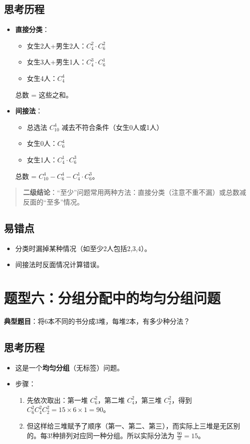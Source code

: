 \documentclass[10pt]{article}
\begin{document}
\subsection*{思考历程}
\begin{itemize}
\item \textbf{直接分类}：
\begin{itemize}
\item 女生2人+男生2人：\(C_4^2 \cdot C_6^2\)
\item 女生3人+男生1人：\(C_4^3 \cdot C_6^1\)
\item 女生4人：\(C_4^4\)
\end{itemize}
总数 = 这些之和。
\item \textbf{间接法}：
\begin{itemize}
\item 总选法 \(C_{10}^4\) 减去不符合条件（女生0人或1人）
\item 女生0人：\(C_6^4\)
\item 女生1人：\(C_4^1 \cdot C_6^3\)
\end{itemize}
总数 = \(C_{10}^4 - C_6^4 - C_4^1 \cdot C_6^3\)。
\end{itemize}

\begin{quote}
\textbf{二级结论}：“至少”问题常用两种方法：直接分类（注意不重不漏）或总数减反面的“至多”情况。
\end{quote}

\subsection*{易错点}
\begin{itemize}
\item 分类时漏掉某种情况（如至少2人包括2,3,4）。
\item 间接法时反面情况计算错误。
\end{itemize}

\section{题型六：分组分配中的均匀分组问题}

\textbf{典型题目}：将6本不同的书分成3堆，每堆2本，有多少种分法？

\subsection*{思考历程}
\begin{itemize}
\item 这是一个\textbf{均匀分组}（无标签）问题。
\item 步骤：
\begin{enumerate}
\item 先依次取出：第一堆 \(C_6^2\)，第二堆 \(C_4^2\)，第三堆 \(C_2^2\)，得到 \(C_6^2 C_4^2 C_2^2 = 15 \times 6 \times 1 = 90\)。
\item 但这样给三堆赋予了顺序（第一、第二、第三），而实际上三堆是无区别的。每3!种排列对应同一种分组。所以实际分法为 \(\frac{90}{3!} = 15\)。
\end{enumerate}
\end{itemize}
\end{document}

